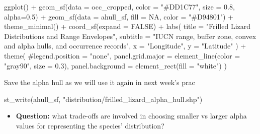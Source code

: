 \documentclass[
  letterpaper,
  DIV=11,
  numbers=noendperiod]{scrartcl}
\newenvironment{Shaded}{\begin{snugshade}}{\end{snugshade}}
\newcommand{\AttributeTok}[1]{\textcolor[rgb]{0.40,0.45,0.13}{#1}}
\newcommand{\CommentTok}[1]{\textcolor[rgb]{0.37,0.37,0.37}{#1}}
\newcommand{\ConstantTok}[1]{\textcolor[rgb]{0.56,0.35,0.01}{#1}}
\newcommand{\FloatTok}[1]{\textcolor[rgb]{0.68,0.00,0.00}{#1}}
\newcommand{\FunctionTok}[1]{\textcolor[rgb]{0.28,0.35,0.67}{#1}}
\newcommand{\NormalTok}[1]{\textcolor[rgb]{0.00,0.23,0.31}{#1}}
\newcommand{\SpecialCharTok}[1]{\textcolor[rgb]{0.37,0.37,0.37}{#1}}
\newcommand{\StringTok}[1]{\textcolor[rgb]{0.13,0.47,0.30}{#1}}
\providecommand{\tightlist}{%
  \setlength{\itemsep}{0pt}\setlength{\parskip}{0pt}}
\begin{document}
\begin{Shaded}
\begin{Highlighting}[]
\FunctionTok{ggplot}\NormalTok{() }\SpecialCharTok{+}
  \FunctionTok{geom\_sf}\NormalTok{(}\AttributeTok{data =}\NormalTok{ occ\_cropped,  }\AttributeTok{color =} \StringTok{"\#DD1C77"}\NormalTok{, }\AttributeTok{size =} \FloatTok{0.8}\NormalTok{, }\AttributeTok{alpha=}\FloatTok{0.5}\NormalTok{) }\SpecialCharTok{+}
  \FunctionTok{geom\_sf}\NormalTok{(}\AttributeTok{data =}\NormalTok{ ahull\_sf, }\AttributeTok{fill =} \ConstantTok{NA}\NormalTok{, }\AttributeTok{color =} \StringTok{"\#D94801"}\NormalTok{) }\SpecialCharTok{+}
  \FunctionTok{theme\_minimal}\NormalTok{() }\SpecialCharTok{+}
  \FunctionTok{coord\_sf}\NormalTok{(}\AttributeTok{expand =} \ConstantTok{FALSE}\NormalTok{) }\SpecialCharTok{+}
  \FunctionTok{labs}\NormalTok{(}
    \AttributeTok{title =} \StringTok{"Frilled Lizard Distributions and Range Envelopes"}\NormalTok{,}
    \AttributeTok{subtitle =} \StringTok{"IUCN range, buffer zone, convex and alpha hulls, and occurrence records"}\NormalTok{,}
    \AttributeTok{x =} \StringTok{"Longitude"}\NormalTok{, }\AttributeTok{y =} \StringTok{"Latitude"}
\NormalTok{  ) }\SpecialCharTok{+}
  \FunctionTok{theme}\NormalTok{(}
    \CommentTok{\#legend.position = "none",}
    \AttributeTok{panel.grid.major =} \FunctionTok{element\_line}\NormalTok{(}\AttributeTok{color =} \StringTok{"gray90"}\NormalTok{, }\AttributeTok{size =} \FloatTok{0.3}\NormalTok{),}
    \AttributeTok{panel.background =} \FunctionTok{element\_rect}\NormalTok{(}\AttributeTok{fill =} \StringTok{"white"}\NormalTok{)}
\NormalTok{  )}
\end{Highlighting}
\end{Shaded}

Save the alpha hull as we will use it again in next week's prac

\begin{Shaded}
\begin{Highlighting}[]
\FunctionTok{st\_write}\NormalTok{(ahull\_sf, }\StringTok{"distribution/frilled\_lizard\_alpha\_hull.shp"}\NormalTok{)}
\end{Highlighting}
\end{Shaded}

\begin{itemize}
\tightlist
\item
  \textbf{Question:} what trade-offs are involved in choosing smaller vs
  larger alpha values for representing the species' distribution?
\end{itemize}
\end{document}
